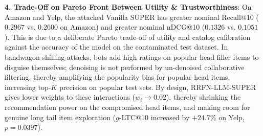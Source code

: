 \documentclass[10pt,journal]{IEEEtran}
\begin{document}
\textbf{4. Trade-Off on Pareto Front Between Utility \& Trustworthiness}: On Amazon and Yelp, the attacked Vanilla SUPER has greater nominal Recall@10 ($0.2967$ vs. $0.2600$ on Amazon) and greater nominal nDCG@10 ($0.1326$ vs. $0.1051$). This is due to a deliberate Pareto trade-off of utility and catalog calibration against the accuracy of the model on the contaminated test dataset. In bandwagon shilling attacks, bots add high ratings on popular head filler items to disguise themselves; denoising is not performed by un-denoised collaborative filtering, thereby amplifying the popularity bias for popular head items, increasing top-$K$ precision on popular test sets. By design, RRFN-LLM-SUPER gives lower weights to these interactions ($w_i \to 0.02$), thereby shrinking the recommendation power on the compromised head items, and making room for genuine long tail item exploration ($g$-LTC@10 increased by $+24.7\%$ on Yelp, $p = 0.0397$).

\begin{table}[t]
\caption{Component Ablation Study on MovieLens-1M under 15\% Bandwagon Attack.}
\label{tab:ablation}
\centering
\setlength{\tabcolsep}{3pt}
\end{table}
\end{document}
